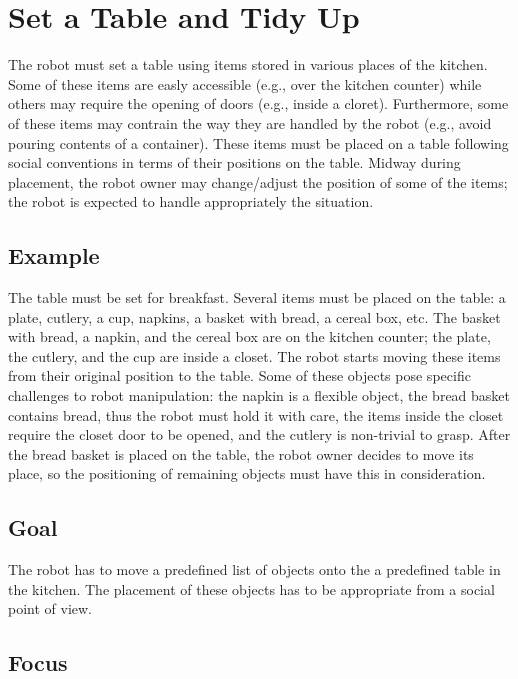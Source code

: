 \section{Set a Table and Tidy Up}

The robot must set a table using items stored in various places of the kitchen. Some of these items are easly accessible (e.g., over the kitchen counter) while others may require the opening of doors (e.g., inside a cloret). Furthermore, some of these items may contrain the way they are handled by the robot (e.g., avoid pouring contents of a container). These items must be placed on a table following social conventions in terms of their positions on the table. Midway during placement, the robot owner may change/adjust the position of some of the items; the robot is expected to handle appropriately the situation.

\subsection{Example}

The table must be set for breakfast. Several items must be placed on the table: a plate, cutlery, a cup, napkins, a basket with bread, a cereal box, etc. The basket with bread, a napkin, and the cereal box are on the kitchen counter; the plate, the cutlery, and the cup are inside a closet. The robot starts moving these items from their original position to the table. Some of these objects pose specific challenges to robot manipulation: the napkin is a flexible object, the bread basket contains bread, thus the robot must hold it with care, the items inside the closet require the closet door to be opened, and the cutlery is non-trivial to grasp. After the bread basket is placed on the table, the robot owner decides to move its place, so the positioning of remaining objects must have this in consideration.

\subsection{Goal}

The robot has to move a predefined list of objects onto the a predefined table in the kitchen. The placement of these objects has to be appropriate from a social point of view.

\subsection{Focus}

